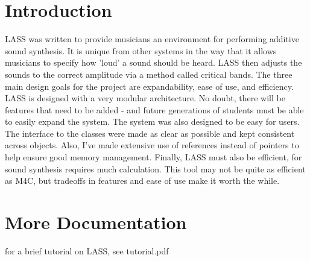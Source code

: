 \hypertarget{index_intro}{}\section{Introduction}\label{intro}
LASS was written to provide musicians an environment for performing additive sound synthesis. It is unique from other systems in the way that it allows musicians to specify how 'loud' a sound should be heard. LASS then adjusts the sounds to the correct amplitude via a method called critical bands. The three main design goals for the project are expandability, ease of use, and efficiency. LASS is designed with a very modular architecture. No doubt, there will be features that need to be added - and future generations of students must be able to easily expand the system. The system was also designed to be easy for users. The interface to the classes were made as clear as possible and kept consistent across objects. Also, I've made extensive use of references instead of pointers to help ensure good memory management. Finally, LASS must also be efficient, for sound synthesis requires much calculation. This tool may not be quite as efficient as M4C, but tradeoffs in features and ease of use make it worth the while.\hypertarget{index_more}{}\section{More Documentation}\label{more}
for a brief tutorial on LASS, see tutorial.pdf 
